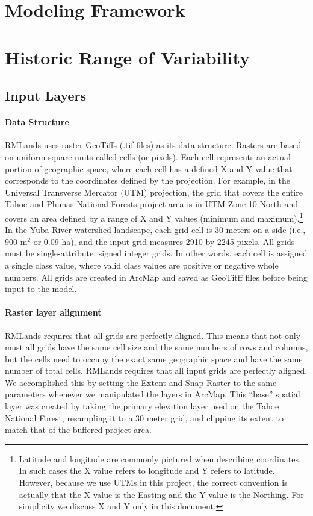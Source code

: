 \section{Modeling Framework}
\label{sec:modelframe}

\section{Historic Range of Variability}

\subsection{Input Layers}
\label{subsec:hrvinputlayers}

\paragraph{Data Structure} RMLands uses raster GeoTiffs (.tif files) as its data structure. Rasters are based on uniform square units called cells (or pixels). Each cell represents an actual portion of geographic space, where each cell has a defined X and Y value that corresponds to the coordinates defined by the projection. For example, in the Universal Transverse Mercator (UTM) projection, the grid that covers the entire Tahoe and Plumas National Forests project area is in UTM Zone 10 North and covers an area defined by a range of X and Y values (minimum and maximum).\footnote{Latitude and longitude are commonly pictured when describing coordinates. In such cases the X value refers to longitude and Y refers to latitude. However, because we use UTMs in this project, the correct convention is actually that the X value is the Easting and the Y value is the Northing. For simplicity we discuss X and Y only in this document.} In the Yuba River watershed landscape, each grid cell is 30 meters on a side (i.e., 900 m$^2$ or 0.09 ha), and the input grid measures 2910 by 2245 pixels. All grids must be single-attribute, signed integer grids. In other words, each cell is assigned a single class value, where valid class values are positive or negative whole numbers. All grids are created in ArcMap and saved as GeoTitff files before being input to the model. 

\paragraph{Raster layer alignment} RMLands requires that all grids are perfectly aligned. This means that not only must all grids have the same cell size and the same numbers of rows and columns, but the cells need to occupy the exact same geographic space and have the same number of total cells. RMLands requires that all input grids are perfectly aligned. We accomplished this by setting the Extent and Snap Raster to the same parameters whenever we manipulated the layers in ArcMap. This ``base'' spatial layer was created by taking the primary elevation layer used on the Tahoe National Forest, resampling it to a 30 meter grid, and clipping its extent to match that of the buffered project area.

